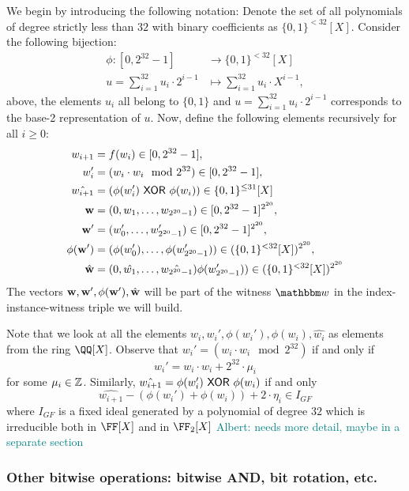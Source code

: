 \documentclass[11pt,letterpaper,usenames,dvipsnames]{article}
\newcommand{\albert}[1]{\textcolor{teal}{Albert: {#1}}}
\begin{document}
We begin by introducing the following notation: Denote the set of all polynomials of degree strictly less than $32$ with binary coefficients as $\{0,1\}^{< 32}[X]$. Consider the following bijection:
%
\begin{align*}
\phi: [0,2^{32}-1] &\to \{0,1\}^{< 32}[X]\\
u= \sum_{i=1}^{32} u_i\cdot 2^{i-1} &\mapsto \sum_{i=1}^{32} u_i \cdot X^{i-1},
\end{align*}
%
above, the elements $u_i$ all belong to $\{0,1\}$ and $u= \sum_{i=1}^{32} u_i\cdot 2^{i-1}$ corresponds to the base-2 representation of $u$.  Now, define the following elements recursively for all $i\geq 0$:
\begin{align*}
    w_{i+1} &= f(w_i) \in [0, 2^{32}-1],\\ 
    w_i' &= (w_i \cdot w_i \mod 2^{32}) \in  [0, 2^{32}-1],\\
    \hat{w_{i+1}} &= \left(\phi(w_i') \ \mathsf{XOR}\  \phi(w_i)\right) \in \{0,1\}^{\leq 31}[X]\\
     \mathbf{w}&=(0, w_1,\ldots, w_{2^{20}-1}) \in [0,2^{32}-1]^{2^{20}},\\
     \mathbf{w}' &= (w_0',\ldots, w_{2^{20}-1}')\in [0,2^{32}-1]^{2^{20}},\\
     \phi(\mathbf{w}') &= (\phi(w_0'),\ldots, \phi(w_{2^{20}-1}'))\in (\{0,1\}^{< 32}[X])^{2^{20}},\\
     \hat{\mathbf{w}} &= (0,\hat{w_1}, \ldots, \hat{w_{2^{20}-1}})\phi(w_{2^{20}-1}'))\in (\{0,1\}^{< 32}[X])^{2^{20}}
\end{align*}
The vectors $\mathbf{w}, \mathbf{w}', \phi(\mathbf{w}'), \hat{\mathbf{w}}$ will be part of the witness $\wit$ in the index-instance-witness triple we will build. 

Note that we look at all the elements $w_i, w_i', \phi(w_i'), \phi(w_i), \hat{w_i}$ as elements from the ring $\QQ[X]$. Observe that $w_i' =  (w_i \cdot w_i \mod 2^{32}) $  if and only if
%
$$
w_i' = w_i \cdot w_i  + 2^{32}\cdot \mu_i
$$
for some $\mu_i \in \mathbb{Z}$. Similarly, $\hat{w_{i+1}} = \phi(w_i') \ \mathsf{XOR}\  \phi(w_i)$ if and only
%
$$
\hat{w_{i+1}} - (\phi(w_i') + \phi(w_i)) + 2\cdot \eta_i \in I_{GF}
$$
where $I_{GF}$ is a fixed ideal generated by  a polynomial of degree $32$ which is irreducible both in $\FF[X]$ and in $\FF_2[X]$ \albert{needs more detail, maybe in a separate section}

%







\subsubsection{Other bitwise operations: bitwise AND, bit rotation, etc.}
\end{document}
